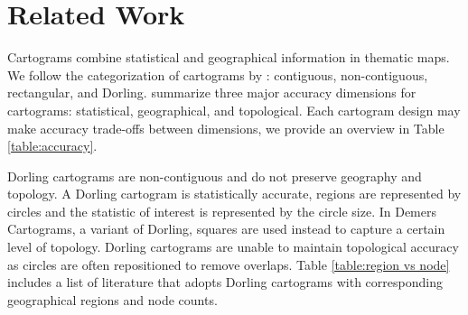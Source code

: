 \section{Related Work}

Cartograms combine statistical and geographical information in thematic maps. We follow the categorization of cartograms by \citeauthor{vankreveld2004Rectangular} \cite{vankreveld2004Rectangular}: contiguous, non-contiguous, rectangular, and Dorling. \citeauthor{nusrat2016State} \cite{nusrat2016State} summarize three major accuracy dimensions for cartograms: statistical, geographical, and topological. Each cartogram design may make accuracy trade-offs between dimensions, we provide an overview in Table \ref{table:accuracy}.

{
\renewcommand{\arraystretch}{1.5}
\begin{table*}[!tb]
	\centering
	\caption{\textcolor{Mycolor3}{\textbf{Trade-off between dimensions}}. \textcolor{Mycolor6}{\textbf{Dimension sacrificed}} in order to improve \textcolor{Mycolor5}{\textbf{target dimension}}'s accuracy.}
	\label{table:accuracy}
\end{table*}
}


Dorling cartograms are non-contiguous and do not preserve geography and topology. A Dorling cartogram is statistically accurate, regions are represented by circles and the statistic of interest is represented by the circle size. In Demers Cartograms, a variant of Dorling, squares are used instead to capture a certain level of topology. Dorling cartograms are unable to maintain topological accuracy as circles are often repositioned to remove overlaps. Table \ref{table:region vs node} includes a list of literature that adopts Dorling cartograms with corresponding geographical regions and node counts.

